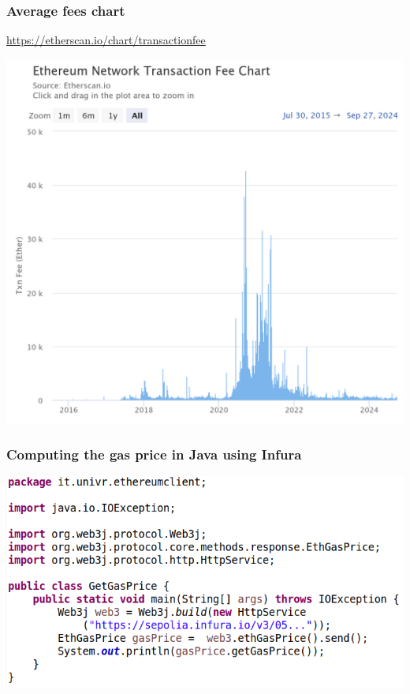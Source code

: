 \documentclass[11pt]{beamer}  %
\begin{document}
\begin{frame}\frametitle{Average fees chart}

  \begin{greenbox}{\url{https://etherscan.io/chart/transactionfee}}
    \begin{center}
      \includegraphics[scale=0.16,clip=false]{pictures/ethereum-fees-chart.png}
    \end{center}
  \end{greenbox}

\end{frame}

\begin{frame}\frametitle{Computing the gas price in Java using Infura}

  \begin{center}
    \includegraphics[width=\textwidth,clip=false]{pictures/get-gas-price-java.png}
  \end{center}

\end{frame}
\end{document}
